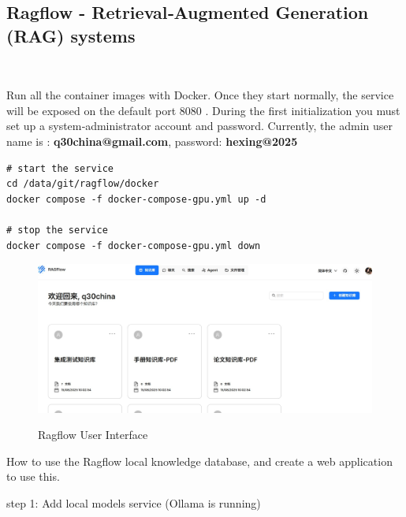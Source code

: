 \subsection{ Ragflow - Retrieval‑Augmented Generation (RAG) systems}\

Run all the container images with Docker. Once they start normally, the service will be exposed on the default port 8080 . During the first initialization you must set up a system‑administrator account and password. Currently, the admin user name is : \textbf{q30china@gmail.com}, password:\textbf{ hexing@2025}

\vspace{0.5cm}

\begin{lstlisting}
# start the service
cd /data/git/ragflow/docker
docker compose -f docker-compose-gpu.yml up -d

# stop the service
docker compose -f docker-compose-gpu.yml down
\end{lstlisting}

\vspace{0.5cm}

\begin{figure}[H]
    \begin{center}
        \includegraphics[width=.95\linewidth]{res/ragflow.jpg}\\
        \caption{Ragflow User Interface }\label{ragflow}
    \end{center}
\end{figure} 

How to use the Ragflow local knowledge database, and create a web application to use this.

step 1: Add local models service (Ollama is running)


